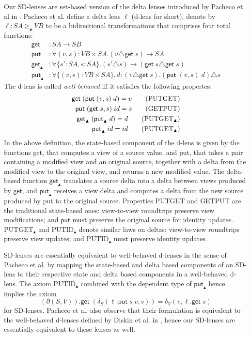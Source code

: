 \documentclass[acmsmall,review,anonymous]{acmart}\settopmatter{printfolios=true,printccs=false,printacmref=false}
\newcommand{\kw}[1]{\ensuremath{\mathsf{#1}}\xspace}
\newcommand{\get}{\ensuremath{\kw{get}}\xspace}
\newcommand{\pput}{\ensuremath{\kw{put}}\xspace}
\begin{document}
Our SD-lenses are set-based version of the delta lenses introduced by Pacheco et
al in \cite{pacheco2012delta}. Pacheco et al. define a delta lens $\ell$ (d-lens
for short), denote by $\ell: SA \trianglerighteq_{\blacktriangle} VB$ to be a
bidirectional transformations that comprises four total functions:
\begin{align*}
\get &: SA \longrightarrow SB\\
\pput &: \forall(v, s) : VB \times SA. (v \triangle \get \;s) \longrightarrow
SA\\
\get_{\blacktriangle} &: \forall\{s':SA, s:SA\}. (s' \triangle s)
\longrightarrow (\get \; s \triangle \get \; s)\\
\pput_{\blacktriangle} &:\forall\{(v, s):VB \times SA\},d:(v \triangle \get
\;s).(\pput \; (v, s) \; d) \triangle s
\end{align*}
The d-lens is called {\em well-behaved} iff it satisfies the following
propertes:
\begin{align*}
\get \; (\pput \; (v, s) \; d) = v \tag{PUTGET}\\
\pput \; (\get \; s, s) \; id = s \tag{GETPUT}\\
\get_{\blacktriangle} \; (\pput_{\blacktriangle} \; d) = d
\tag{$\text{PUTGET}_{\blacktriangle}$}\\
\pput_{\blacktriangle} \; id = id \tag{$\text{PUTGET}_{\blacktriangle}$}
\end{align*}
In the above definition, the state-based component of the d-lens is given by
the functions get, that computes a view of a source value, and put, that takes
a pair containing a modified view and an original source, together with a delta
from the modified view to the original view, and returns a new modified value.
The delta-based function $\get_{\blacktriangle}$ translates a source delta into
a delta between views produced by $\get$, and $\pput_{\blacktriangle}$ receives
a view delta and computes a delta from the new source produced by put to the
original source. Properties PUTGET and GETPUT are the traditional state-based
ones: view-to-view roundtrips preserve view modifications; and $\pput$ must
preserve the original source for identity updates.
$\text{PUTGET}_{\blacktriangle}$ and $\text{PUTID}_{\blacktriangle}$ denote
similar laws on deltas: view-to-view roundtrips preserve view updates; and
$\text{PUTID}_{\blacktriangle}$ must preserve identity updates.

SD-lenses are essentially equivalent to well-behaved d-lenses in the sense of
Pacheco et al.
by mapping the state-based and delta based components of an SD-lens to
their respective state and delta based components in a well-behaved d-lens.
The axiom $\text{PUTID}_{\blacktriangle}$ combined with the dependent type of
$\pput_{\blacktriangle}$ hence implies the axiom
$$(\partial (S, V)).\get \; (\delta_S(\ell.\pput \; s \; v, s)) = \delta_V(v,
\ell.\get \; s)$$ 
for SD-lenses. Pacheco et al. also observe that their formulation is equivalent
to the well-behaved d-lenses defined by Diskin et al. in
\cite{diskin2011asymmetric}, hence our SD-lenses are essentially equivalent to
these lenses as well.
\end{document}

